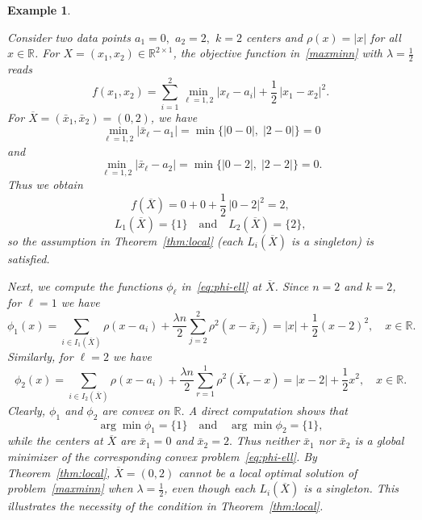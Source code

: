 \documentclass[11pt]{article}
\newtheorem{example}[theorem]{Example}
\theoremstyle{definition}
\newcommand{\R}{\mathbb{R}}
\newcommand{\1}{\mathbf{1}}
\def\Bar{\overline}
\begin{document}
\begin{example}\label{ex:local-thm-lambda-1/2}
{\rm
Consider two data points
$a_1=0,$ $a_2=2,$ $k=2$ centers and $\rho(x)=|x|$ for all $x\in\R$. For $X=(x_1,x_2)\in\R^{2\times 1}$, the
objective function in~\eqref{maxminn} with $\lambda=\tfrac12$ reads
\[
f(x_1,x_2)
=
\sum_{i=1}^2 \min_{\ell=1,2}|x_\ell-a_i|
+\frac12\,|x_1-x_2|^2.
\]
For $\Bar X=(\bar x_1,\bar x_2)=(0,2)$,
we have
\[\min_{\ell=1,2}|\bar x_\ell-a_1|=\min\{|0-0|,\;|2-0|\}=0\]
and
\[\min_{\ell=1,2}|\bar x_\ell-a_2|=\min\{|0-2|,\;|2-2|\}=0.\]
Thus we obtain
\[f(\Bar X)=0+0+\frac12\,|0-2|^2=2,\]
\[L_1(\Bar X)=\{1\}\quad\text{and}\quad L_2(\Bar X)=\{2\},\]
so the assumption in Theorem~\ref{thm:local} (each $L_i(\Bar X)$ is a singleton)
is satisfied. 


Next, we compute the functions $\phi_\ell$ in~\eqref{eq:phi-ell} at $\Bar X$.
Since $n=2$ and $k=2$, for $\ell=1$ we have
\[
\phi_1(x)
=
\sum_{i\in I_1(\Bar X)}\rho(x-a_i)
+
\frac{\lambda n}{2}
\sum_{j=2}^2 \rho^2(x-\bar x_j)
=|x|+\frac12(x-2)^2,\quad x\in\R.
\]
Similarly, for $\ell=2$ we have
\[
\phi_2(x)
=
\sum_{i\in I_2(\Bar X)}\rho(x-a_i)
+
\frac{\lambda n}{2}
\sum_{r=1}^1 \rho^2(\bar X_r-x)
=|x-2|+\frac12 x^2,\quad x\in\R.
\]
Clearly,
$\phi_1$ and $\phi_2$ are convex on $\R$.
 A direct computation shows that
\[
\arg\min \phi_1 = \{1\}\quad\text{and}\quad \arg\min \phi_2 = \{1\},
\]
while the centers at $\Bar X$ are
$\bar x_1=0$ and $\bar x_2=2.$
Thus neither $\bar x_1$ nor $\bar x_2$ is a global minimizer of the corresponding
convex problem~\eqref{eq:phi-ell}.
By Theorem~\ref{thm:local},  $\Bar X=(0,2)$ \emph{cannot} be a local optimal solution of
problem~\eqref{maxminn} when $\lambda=\tfrac12$, even though each
$L_i(\Bar X)$ is a singleton. This illustrates the \emph{necessity} of the
condition in Theorem~\ref{thm:local}.


}
\end{example}
\end{document}
